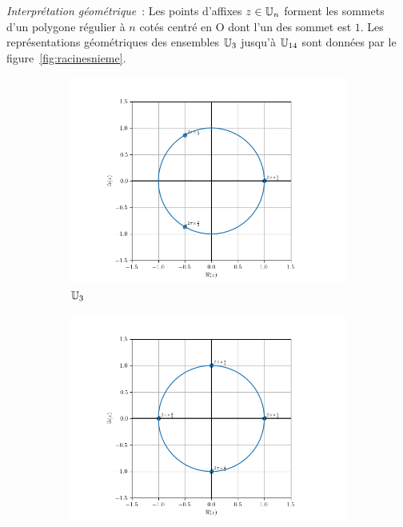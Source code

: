 \emph{Interprétation géométrique}~: Les points d'affixes \(z \in \mathbb{U}_n\) forment les sommets d'un polygone régulier à \(n\) cotés centré en O dont l'un des sommet est \(1\). Les représentations géométriques des ensembles \(\mathbb{U}_3\) jusqu'à \(\mathbb{U}_{14}\) sont données par le figure~\ref{fig:racinesnieme}.
\begin{figure}
    \begin{subfigure}{.3\textwidth}
      \centering
      \includegraphics[scale=.33]{U_3.png}  
      \caption{$\mathbb{U}_3$}
      \label{fig:U3}
    \end{subfigure}
    \begin{subfigure}{.3\textwidth}
      \centering
      \includegraphics[scale=.33]{U_4.png}  

\end{subfigure}
\end{figure}

